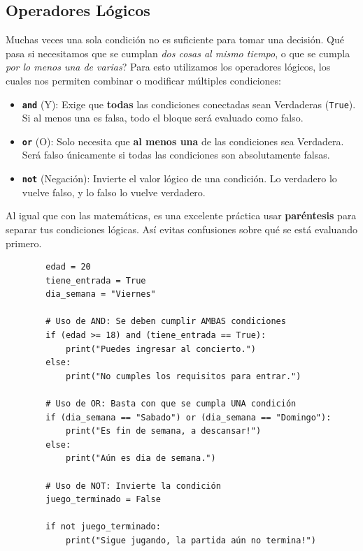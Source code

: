 \documentclass[11pt, a4paper]{article}
\begin{document}
	\subsection{Operadores Lógicos}
	Muchas veces una sola condición no es suficiente para tomar una decisión. Qué pasa si necesitamos que se cumplan \textit{dos cosas al mismo tiempo}, o que se cumpla \textit{por lo menos una de varias}? Para esto utilizamos los operadores lógicos, los cuales nos permiten combinar o modificar múltiples condiciones:
	
	\begin{itemize}
		\item \textbf{\texttt{and}} (Y): Exige que \textbf{todas} las condiciones conectadas sean Verdaderas (\texttt{True}). Si al menos una es falsa, todo el bloque será evaluado como falso.
		
		\item \textbf{\texttt{or}} (O): Solo necesita que \textbf{al menos una} de las condiciones sea Verdadera. Será falso únicamente si todas las condiciones son absolutamente falsas.
		
		\item \textbf{\texttt{not}} (Negación): Invierte el valor lógico de una condición. Lo verdadero lo vuelve falso, y lo falso lo vuelve verdadero.
	\end{itemize}
	
	Al igual que con las matemáticas, es una excelente práctica usar \textbf{paréntesis} para separar tus condiciones lógicas. Así evitas confusiones sobre qué se está evaluando primero. \\
	
	\begin{lstlisting}
		edad = 20
		tiene_entrada = True
		dia_semana = "Viernes"
		
		# Uso de AND: Se deben cumplir AMBAS condiciones
		if (edad >= 18) and (tiene_entrada == True):
			print("Puedes ingresar al concierto.")
		else:
			print("No cumples los requisitos para entrar.")
		
		# Uso de OR: Basta con que se cumpla UNA condición
		if (dia_semana == "Sabado") or (dia_semana == "Domingo"):
			print("Es fin de semana, a descansar!")
		else:
			print("Aún es dia de semana.")
		
		# Uso de NOT: Invierte la condición
		juego_terminado = False
		
		if not juego_terminado:
			print("Sigue jugando, la partida aún no termina!")
	\end{lstlisting}
	
\end{document}
